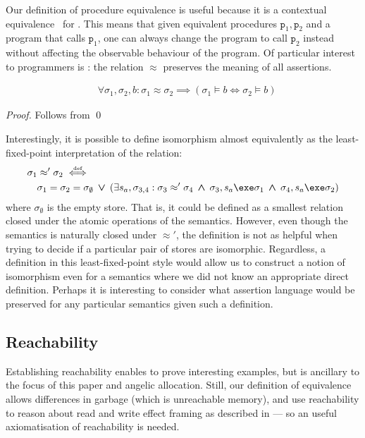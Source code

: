\documentclass[runningheads,a4paper]{llncs}
\DeclareMathOperator{\band}{\bm{\;\land\;}}
\DeclareMathOperator{\bor}{\bm{\;\lor\;}}
\DeclareMathOperator{\suchthat}{:}
\newcommand*{\qvars}[2]{#1_{#2}}
\newcommand*{\defiff}{\stackrel{\text{\tiny def}}{\iff}}
\newcommand*\iso{\approx}
\newcommand*{\fun}{\texttt{p}}
\newcommand*{\store}{\sigma}
\newcommand*{\isoref}{\hyperref[def:global isomorphism]{\ensuremath{\iso}}}
\begin{document}
Our definition of procedure equivalence is useful because it is a contextual equivalence~\cite{Milner1977} for \lang{}. This means that given equivalent procedures $\fun_1,\fun_2$ and a program that calls $\fun_1$, one can always change the program to call $\fun_2$ instead without affecting the observable behaviour of the program.  Of particular interest to programmers is : the relation \isoref{} preserves the meaning of all assertions.

\begin{corollary}\label{lem:assertion preserving}
	\[\begin{aligned}
		&\forall \store_1,\store_2,b \suchthat \store_1 \iso \store_2  \implies (\store_1\vDash{b} \iff \store_2\vDash{b})
	\end{aligned}\]
\end{corollary}
\begin{proof}Follows from \qed\end{proof}

Interestingly, it is possible to define isomorphism almost equivalently as the least-fixed-point interpretation of the relation:
\[\begin{aligned}
&	\store_1\iso'\store_2 \defiff \\
&\quad		\store_1=\store_2=\store_\emptyset \bor
		\left(\exists s_a,\qvars{\store}{3,4} : \store_3\iso'\store_4 \band \store_3,s_a\exe\store_1 \band \store_4,s_a\exe\store_2\right)
\end{aligned}\]
where $\store_\emptyset$ is the empty store. That is, it could be defined as a smallest relation closed under the atomic operations of the semantics. However, even though the semantics is naturally closed under $\iso'$, the definition is not as helpful when trying to decide if a particular pair of stores are isomorphic. Regardless, a definition in this least-fixed-point style would allow us to construct a notion of isomorphism even for a semantics where we did not know an appropriate direct definition. Perhaps it is interesting to consider what assertion language would be preserved for any particular semantics given such a definition.

\subsection{Reachability}\label{sec:reachability}

Establishing reachability enables \tool{} to prove interesting examples, but is ancillary to the focus of this paper \metho{} and angelic allocation. Still, our definition of equivalence allows differences in garbage (which is unreachable memory), and \tool{} use reachability to reason about read and write effect framing as described in  --- so an useful axiomatisation of reachability is needed.
\end{document}
